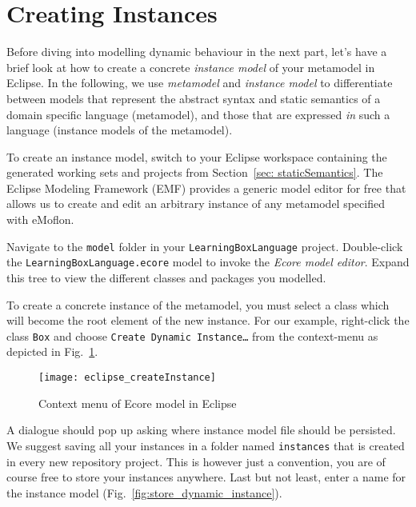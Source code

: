 \newpage
\genHeader

\section{Creating Instances}

\hypertarget{creatingInstance common}{}Before diving into modelling dynamic behaviour in the next part, let's have a brief look at how to create a concrete \emph{instance model} of your metamodel in Eclipse.
In the following, we use \emph{metamodel} and \emph{instance model} to differentiate between models that represent the abstract syntax and static semantics of a domain specific language (metamodel), and those that are expressed \emph{in} such a language (instance models of the metamodel).

To create an instance model, switch to your Eclipse workspace containing the generated working sets and projects from Section~\ref{sec: staticSemantics}. The Eclipse Modeling Framework (EMF) provides a generic model editor for free that allows us to create and edit an arbitrary instance of any metamodel specified with eMoflon.

Navigate to the \texttt{model} folder in your \texttt{LearningBoxLanguage} project.
Double-click the \texttt{LearningBoxLanguage.ecore} model to invoke  the \emph{Ecore model editor}.
Expand this tree to view the different classes and packages you modelled. %

To create a concrete instance of the metamodel, you must select a class which will become the root element of the new instance.
For our example, right-click the class \texttt{Box} and choose \texttt{Create Dynamic Instance\ldots} from the context-menu as depicted in Fig.~\ref{fig:context_menu}.

\begin{figure}[htbp]
	\centering
  \texttt{[image: eclipse\_createInstance]}
	\caption{Context menu of Ecore model in Eclipse}
	\label{fig:context_menu}
\end{figure}


A dialogue should pop up asking where instance model file should be persisted.
We suggest saving all your instances in a folder named \texttt{instances} that is created in every new repository project.
This is however just a convention, you are of course free to store your instances anywhere.
Last but not least, enter a name for the instance model (Fig.~\ref{fig:store_dynamic_instance}).

